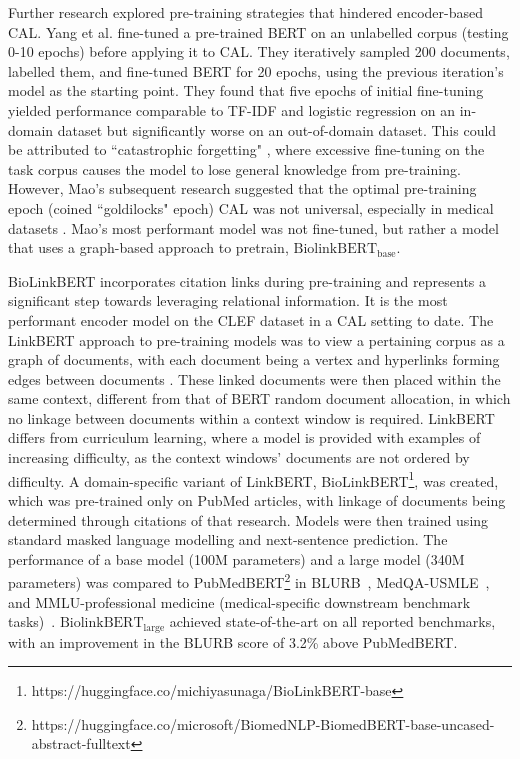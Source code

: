 \documentclass[10pt, english]{article}
\begin{document}
Further research explored pre-training strategies that hindered encoder-based CAL. Yang et al. \cite{yang_goldilocks_2022} fine-tuned a pre-trained BERT on an unlabelled corpus (testing 0-10 epochs) before applying it to CAL. They iteratively sampled 200 documents, labelled them, and fine-tuned BERT for 20 epochs, using the previous iteration's model as the starting point. They found that five epochs of initial fine-tuning yielded performance comparable to TF-IDF and logistic regression on an in-domain dataset but significantly worse on an out-of-domain dataset. This could be attributed to ``catastrophic forgetting" \cite{xu_forget_2020}, where excessive fine-tuning on the task corpus causes the model to lose general knowledge from pre-training. However, Mao's subsequent research suggested that the optimal pre-training epoch (coined ``goldilocks" epoch) CAL was not universal, especially in medical datasets \cite{mao_reproducibility_2024}. Mao's most performant model was not fine-tuned, but rather a model that uses a graph-based approach to pretrain, ${\text{BiolinkBERT}}_{\text{base}}$.

BioLinkBERT incorporates citation links during pre-training and represents a significant step towards leveraging relational information. It is the most performant encoder model on the CLEF dataset in a CAL setting to date. The LinkBERT approach to pre-training models was to view a pertaining corpus as a graph of documents, with each document being a vertex and hyperlinks forming edges between documents \cite{yasunaga_linkbert_2022}. These linked documents were then placed within the same context, different from that of BERT random document allocation, in which no linkage between documents within a context window is required. LinkBERT differs from curriculum learning, where a model is provided with examples of increasing difficulty, as the context windows' documents are not ordered by difficulty. A domain-specific variant of LinkBERT, BioLinkBERT\footnote{https://huggingface.co/michiyasunaga/BioLinkBERT-base}, was created, which was pre-trained only on PubMed articles, with linkage of documents being determined through citations of that research. Models were then trained using standard masked language modelling and next-sentence prediction. The performance of a base model (100M parameters) and a large model (340M parameters) was compared to PubMedBERT\footnote{https://huggingface.co/microsoft/BiomedNLP-BiomedBERT-base-uncased-abstract-fulltext} in BLURB~\cite{gu_domain-specific_2021}, MedQA-USMLE~\cite{jin_what_2021}, and MMLU-professional medicine (medical-specific downstream benchmark tasks)~\cite{hendrycks_measuring_2021}. ${\text{BiolinkBERT}}_{\text{large}}$ achieved state-of-the-art on all reported benchmarks, with an improvement in the BLURB score of 3.2\% above PubMedBERT.
\end{document}
